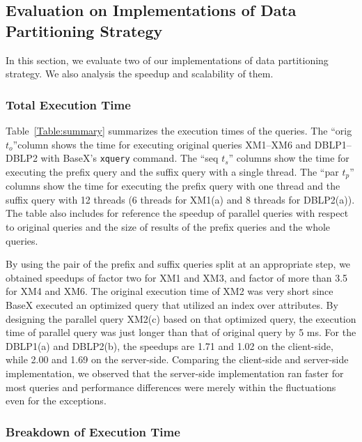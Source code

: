 \subsection{Evaluation on Implementations of Data Partitioning Strategy}

In this section, we evaluate two of our implementations of data partitioning
strategy. We also analysis the speedup and scalability of them.

\subsubsection{Total Execution Time}



Table~\ref{Table:summary} summarizes the execution times of the queries. The
``orig $t_o$''column shows the time for executing original queries XM1--XM6 and
DBLP1--DBLP2 with BaseX's \verb|xquery| command. The ``seq $t_s$'' columns show
the time for executing the prefix query and the suffix query with a single
thread. The ``par $t_p$'' columns show the time for executing the prefix query
with one thread and the suffix query with 12 threads (6 threads for XM1(a) and 8
threads for DBLP2(a)).  The table also includes for reference the speedup of
parallel queries with respect to original queries and the size of results of the
prefix queries and the whole queries.

By using the pair of the prefix and suffix queries split at an appropriate step,
we obtained speedups of factor two for XM1 and XM3, and factor of more than 3.5
for XM4 and XM6. The original execution time of XM2 was very short since BaseX
executed an optimized query that utilized an index over attributes. By designing
the parallel query XM2(c) based on that optimized query, the execution time of
parallel query was just longer than that of original query by 5 ms. For the
DBLP1(a) and DBLP2(b), the speedups are 1.71 and 1.02 on the client-side, while
2.00 and  1.69 on the server-side. Comparing the client-side and server-side
implementation, we observed that the server-side implementation ran faster for
most queries and performance differences were merely within the fluctuations
even for the exceptions.

\subsubsection{Breakdown of Execution Time}

